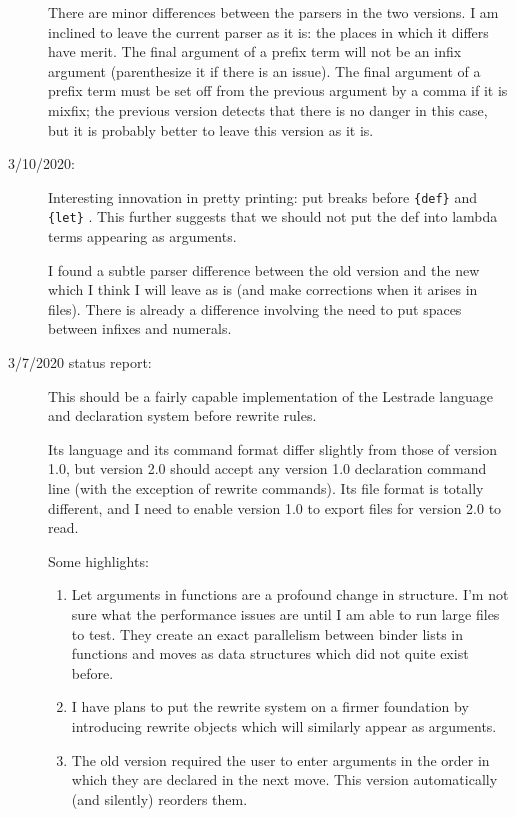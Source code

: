 \documentclass[12pt]{article}
\begin{document}
\begin{description}
There are minor differences between the parsers in the two versions.  I am inclined to leave the current parser as it is:  the places in which it differs have merit.  The final argument of a prefix term will not be an infix argument (parenthesize it if there is an issue).  The final argument of a prefix term must be set off
from the previous argument by a comma if it is mixfix;  the previous version detects that there is no danger in this case, but it is probably better to leave this version as it is.




\item[3/10/2020:] 

Interesting innovation in pretty printing:  put breaks before \verb|{def}|  and \verb |{let}| .  This further suggests that we should not put the def into lambda terms appearing as arguments.

I found a subtle parser difference between the old version and the new which I think I will leave as is
(and make corrections when it arises in files).  There is already a difference involving the need
to put spaces between infixes and numerals.



\item[3/7/2020 status report:]  This should be a fairly capable implementation of the
Lestrade language and declaration system before rewrite rules.

Its language and its command format differ slightly from those of version 1.0, but
version 2.0 should accept any version 1.0 declaration command line
(with the exception of rewrite commands).  Its file format is
totally different, and I need to enable version 1.0 to export files for version 2.0 to read.

Some highlights:

\begin{enumerate}

\item  Let arguments in functions are a profound change in structure.  I'm not sure what
the performance issues are until I am able to run large files to test.  They create an exact
parallelism between binder lists in functions and moves as data structures which did not quite exist before.

\item  I have plans to put the rewrite system on a firmer foundation by introducing rewrite objects
which will similarly appear as arguments.

\item  The old version required the user to enter arguments in the order in which they are declared in the next move.  This version automatically (and silently) reorders them.


\end{enumerate}
\end{description}
\end{document}
